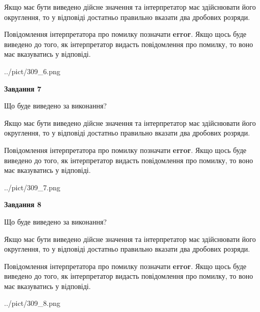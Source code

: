 \documentclass[12pt, ukrainian]{article}
\begin{document}
{\begin {Large}
Якщо має бути виведено дійсне значення та інтерпретатор має здійснювати його округлення, 
то у відповіді достатньо правильно вказати два дробових розряди.

Повідомлення інтерпретатора про помилку позначати \textbf{error}.
Якщо щось буде виведено до того, як інтерпретатор видасть повідомлення про помилку, 
то воно має вказуватись у відповіді. \par

\begin{center}
	{../pict/309_6.png}
\end{center}
\newpage

{\begin {center}\textbf{Завдання 7}\end {center}}\par
Що буде виведено за виконання? \par

Якщо має бути виведено дійсне значення та інтерпретатор має здійснювати його округлення, 
то у відповіді достатньо правильно вказати два дробових розряди.

Повідомлення інтерпретатора про помилку позначати \textbf{error}.
Якщо щось буде виведено до того, як інтерпретатор видасть повідомлення про помилку, 
то воно має вказуватись у відповіді. \par

\begin{center}
	{../pict/309_7.png}
\end{center}
\newpage

{\begin {center}\textbf{Завдання 8}\end {center}}\par
Що буде виведено за виконання? \par

Якщо має бути виведено дійсне значення та інтерпретатор має здійснювати його округлення, 
то у відповіді достатньо правильно вказати два дробових розряди.

Повідомлення інтерпретатора про помилку позначати \textbf{error}.
Якщо щось буде виведено до того, як інтерпретатор видасть повідомлення про помилку, 
то воно має вказуватись у відповіді. \par

\begin{center}
	{../pict/309_8.png}
\end{center}
\newpage


\end{Large}}
\end{document}
